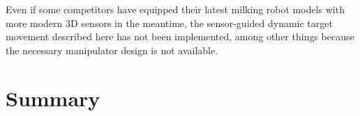 Even if some competitors have equipped their latest milking robot models with more modern 3D sensors in the meantime, the sensor-guided dynamic target movement described here has not been implemented, among other things because the necessary manipulator design is not available.


\section{Summary}\label{chap:2:summary}
\lipsum[2-5]

